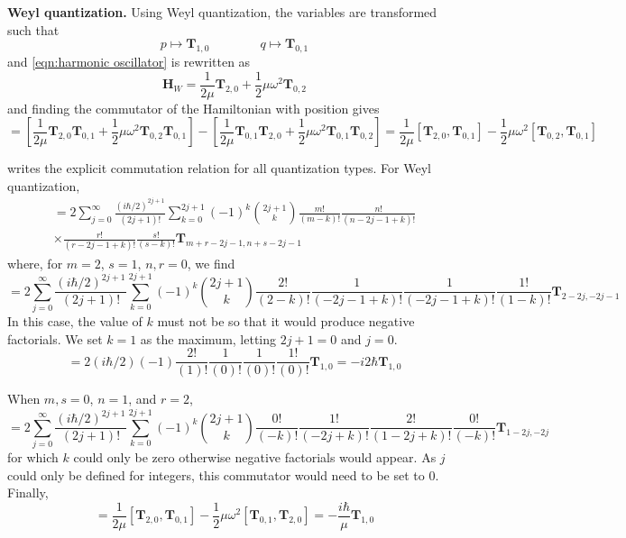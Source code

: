 \documentclass[a4paper]{article}
\theoremstyle{definition}
\begin{document}
\textbf{Weyl quantization.} Using Weyl quantization, the variables are transformed such that 
\begin{equation}
	p\mapsto\textbf{T}_{1,0}\qquad\qquad q\mapsto\textbf{T}_{0,1}
\end{equation}
and \ref{eqn:harmonic oscillator} is rewritten as
\begin{equation}
	\textbf{H}_W=\frac{1}{2\mu}\textbf{T}_{2,0}+\frac{1}{2}\mu\omega^2\textbf{T}_{0,2}
\end{equation}
and finding the commutator of the Hamiltonian with position gives
\begin{equation}
	[\textbf{H}_W,\textbf{T}_{0,1}]=\left[\frac{1}{2\mu}\textbf{T}_{2,0}\textbf{T}_{0,1}+\frac{1}{2}\mu\omega^2\textbf{T}_{0,2}\textbf{T}_{0,1}\right]-\left[\frac{1}{2\mu}\textbf{T}_{0,1}\textbf{T}_{2,0}+\frac{1}{2}\mu\omega^2\textbf{T}_{0,1}\textbf{T}_{0,2}\right]=\frac{1}{2\mu}[\textbf{T}_{2,0},\textbf{T}_{0,1}]-\frac{1}{2}\mu\omega^2[\textbf{T}_{0,2},\textbf{T}_{0,1}]
\end{equation}

\cite{Domingo2015} writes the explicit commutation relation for all quantization types. For Weyl quantization,
\begin{multline}
	[\textbf{T}_{m,n},\textbf{T}_{r,s}]=2\sum_{j=0}^\infty\frac{(i\hbar/2)^{2j+1}}{(2j+1)!}\sum_{k=0}^{2j+1}(-1)^k\binom{2j+1}{k}\frac{m!}{(m-k)!}\frac{n!}{(n-2j-1+k)!}\\\times\frac{r!}{(r-2j-1+k)!}\frac{s!}{(s-k)!}\textbf{T}_{m+r-2j-1,n+s-2j-1}
\end{multline}
where, for $m=2$, $s=1$, $n,r=0$, we find
\begin{equation}
	[\textbf{T}_{2,0},\textbf{T}_{0,1}]=2\sum_{j=0}^\infty\frac{(i\hbar/2)^{2j+1}}{(2j+1)!}\sum_{k=0}^{2j+1}(-1)^k\binom{2j+1}{k}\frac{2!}{(2-k)!}\frac{1}{(-2j-1+k)!}\frac{1}{(-2j-1+k)!}\frac{1!}{(1-k)!}\textbf{T}_{2-2j,-2j-1}
\end{equation}
In this case, the value of $k$ must not be so that it would produce negative factorials. We set $k=1$ as the maximum, letting $2j+1=0$ and $j=0$.
\begin{equation}
	[\textbf{T}_{2,0},\textbf{T}_{0,1}]=2(i\hbar/2)(-1)\frac{2!}{(1)!}\frac{1}{(0)!}\frac{1}{(0)!}\frac{1!}{(0)!}\textbf{T}_{1,0}=-i2\hbar\textbf{T}_{1,0}
\end{equation}

When $m,s=0$, $n=1$, and $r=2$,
\begin{equation}
	[\textbf{T}_{0,1},\textbf{T}_{2,0}]=2\sum_{j=0}^\infty\frac{(i\hbar/2)^{2j+1}}{(2j+1)!}\sum_{k=0}^{2j+1}(-1)^k\binom{2j+1}{k}\frac{0!}{(-k)!}\frac{1!}{(-2j+k)!}\frac{2!}{(1-2j+k)!}\frac{0!}{(-k)!}\textbf{T}_{1-2j,-2j}
\end{equation}
for which $k$ could only be zero otherwise negative factorials would appear. As $j$ could only be defined for integers, this commutator would need to be set to 0. Finally,
\begin{equation}
	[\textbf{H}_W,\textbf{T}_{0,1}]=\frac{1}{2\mu}[\textbf{T}_{2,0},\textbf{T}_{0,1}]-\frac{1}{2}\mu\omega^2[\textbf{T}_{0,1},\textbf{T}_{2,0}]=-\frac{i\hbar}{\mu}\textbf{T}_{1,0}
\end{equation}
\end{document}
